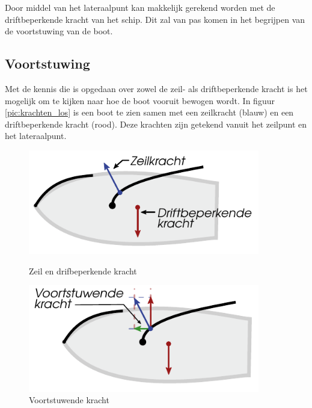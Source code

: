 Door middel van het lateraalpunt kan makkelijk gerekend worden met de driftbeperkende kracht van het schip. Dit zal van pas komen in het begrijpen van de voortstuwing van de boot.

\newpage
\subsection{Voortstuwing}
Met de kennis die is opgedaan over zowel de zeil- als driftbeperkende kracht is het mogelijk om te kijken naar hoe de boot vooruit bewogen wordt. In figuur \ref{pic:krachten_los} is een boot te zien samen met een zeilkracht (blauw) en een driftbeperkende kracht (rood). Deze krachten zijn getekend vanuit het zeilpunt en het lateraalpunt.

\begin{figure}[H]
	\centering
	\begin{minipage}[b]{0.48\textwidth}
		\centering
		\includegraphics[width=0.90\textwidth]{Hoofdstukken/Krachten/pdf/voortstuwing_krachten.pdf}
		\caption{Zeil en drifbeperkende kracht}
		\label{pic:krachten_los}
	\end{minipage}
	\hfill
	\begin{minipage}[b]{0.48\textwidth}
		\centering
		\includegraphics[width=0.90\textwidth]{Hoofdstukken/Krachten/pdf/voortstuwing_totaal.pdf}
		\caption{Voortstuwende kracht}
		\label{pic:voorwaardse_kracht}
	\end{minipage}
\end{figure}

